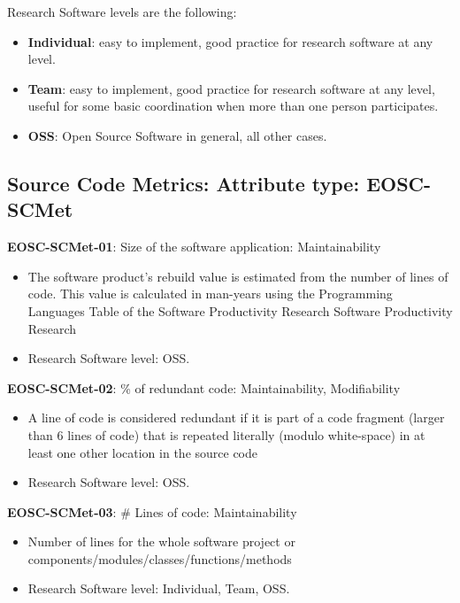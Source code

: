 Research Software levels are the following:
\begin{itemize}
    \item \textbf{{Individual}}: easy to implement, good practice for research software at any level.
    \item \textbf{{Team}}: easy to implement, good practice for research software at any level, useful for some basic coordination when more than one person participates.
    \item \textbf{{OSS}}: Open Source Software in general, all other cases.
\end{itemize}

\subsection{Source Code Metrics: Attribute type: EOSC-SCMet}

\textbf{EOSC-SCMet-01}: Size of the software application: Maintainability

\begin{itemize}
    \item The software product's rebuild value is estimated from the number of lines of code. This value is calculated in man-years using the  Programming Languages Table of the Software Productivity Research Software Productivity Research \cite{baggen_standardized_2012}
    \item Research Software level: OSS.
\end{itemize}

\textbf{EOSC-SCMet-02}: \% of redundant code: Maintainability, Modifiability

\begin{itemize}
    \item A line of code is considered redundant if it is part of a code fragment (larger than 6 lines of code) that is repeated literally (modulo  white-space) in at least one other location in the source code \cite{baggen_standardized_2012}
    \item Research Software level: OSS.
\end{itemize}

\textbf{EOSC-SCMet-03}: \# Lines of code: Maintainability

\begin{itemize}
    \item Number of lines for the whole software project or components/modules/classes/functions/methods \cite{montagud_systematic_2012,baggen_standardized_2012}
    \item Research Software level: Individual, Team, OSS.
\end{itemize}

